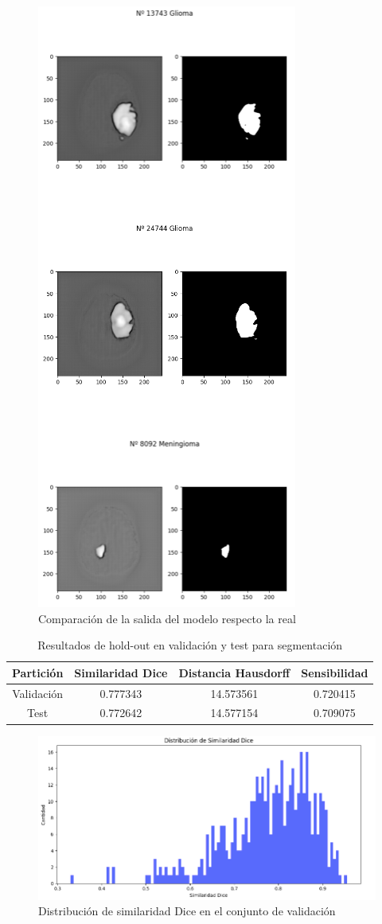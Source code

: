 \begin{figure}[H]
	\centering
	\includegraphics[width=0.5\linewidth]{imagenes/output_segmentation.png}
	\caption{Comparación de la salida del modelo respecto la real}
\end{figure}

\begin{table}[H]
	\centering
	\begin{tabular}{|c|c|c|c|}
		\hline
		Partición & Similaridad Dice & Distancia Hausdorff & Sensibilidad \\ \hline
		Validación & 0.777343 & 14.573561 & 0.720415 \\ \hline
		Test & 0.772642 & 14.577154 & 0.709075 \\ \hline
	\end{tabular}
	\caption{Resultados de hold-out en validación y test para segmentación}
	\label{tabla:resultados5}
\end{table}

\begin{figure}[H]
	\centering
	\includegraphics[width=0.75\linewidth]{imagenes/dist_dice_val.png}
	\caption{Distribución de similaridad Dice en el conjunto de validación}
\end{figure}

